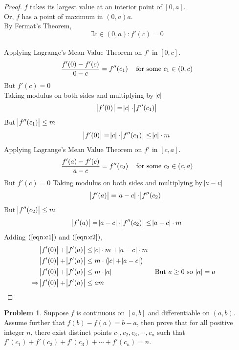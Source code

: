 \documentclass[14]{article}
\theoremstyle{definition}
\newtheorem{prob}{Problem}
\begin{document}
\begin{proof}
$f$ takes its largest value at an interior point of $[0, a]$.\\
Or, $f$ has a point of maximum in $(0, a)a$.\\
By Fermat's Theorem, \[\exists c \in (0, a) : f'(c) = 0\]\\
Applying Lagrange's Mean Value Theorem on $f'$ in $[0, c]$.\\
\[\dfrac{f'(0) - f'(c)}{0 - c} = f''(c_1) \text{\;\;\; for some } c_1 \in (0, c)\]
But $f'(c) = 0$\\
Taking modulus on both sides and multiplying by $\abs{c}$
\[\abs{f'(0)} = \abs{c} \cdot \abs{f''(c_1)}\]
But $\abs{f''(c_1)}\leq m$
\begin{equation}\label{eqn:c1}
\abs{f'(0)} = \abs{c} \cdot \abs{f''(c_1)} \leq \abs{c} \cdot m
\end{equation}
Applying Lagrange's Mean Value Theorem on $f'$ in $[c, a]$.\\
\[\dfrac{f'(a) - f'(c)}{a - c} = f''(c_2) \text{\;\;\; for some } c_2 \in (c, a)\]
But $f'(c) = 0$
Taking modulus on both sides and multiplying by $\abs{a - c}$
\[\abs{f'(a)} = \abs{a - c} \cdot \abs{f''(c_2)}\]
But $\abs{f''(c_2)} \leq m$
\begin{equation}\label{eqn:c2}
\abs{f'(a)} = \abs{a - c} \cdot \abs{f''(c_2)} \leq \abs{a - c} \cdot m
\end{equation}
Adding $(\ref{eqn:c1})$ and $(\ref{eqn:c2})$,
\begin{align*}
\abs{f'(0)} + \abs{f'(a)} &\leq \abs{c} \cdot m + \abs{a - c} \cdot m\\
\abs{f'(0)} + \abs{f'(a)} &\leq m \cdot \left(\abs{c} + \abs{a - c}\right)\\
\abs{f'(0)} + \abs{f'(a)} &\leq m \cdot \abs{a} && \text{But } a \geq 0 \text{ so } \abs{a} = a \\
\Rightarrow \abs{f'(0)} + \abs{f'(a)} &\leq a m
\end{align*}
\end{proof}
\pagebreak
\begin{prob}
Suppose $f$ is continuous on $[a, b]$ and differentiable on $(a, b)$. Assume further that $f(b) - f(a) = b - a$, then prove that for all positive integer $n$, there exist distinct points $c_1, c_2, c_3, \cdots, c_n$ such that $f'(c_1) + f'(c_2) + f'(c_3) + \cdots + f'(c_n) = n$.
\end{prob}
\end{document}
